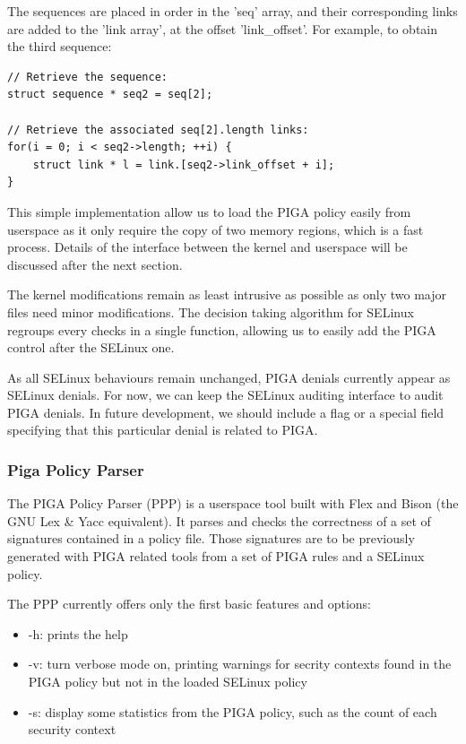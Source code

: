 \documentclass[pdftex,a4paper,titlepage,11pt]{article}
\begin{document}
\smallskip

The sequences are placed in order in the 'seq' array, and their corresponding
links are added to the 'link array', at the offset 'link\_offset'. For example,
to obtain the third sequence:

\begin{lstlisting}
// Retrieve the sequence:
struct sequence * seq2 = seq[2];

// Retrieve the associated seq[2].length links:
for(i = 0; i < seq2->length; ++i) {
	struct link * l = link.[seq2->link_offset + i];
}
\end{lstlisting}

\smallskip

This simple implementation allow us to load the PIGA policy easily from
userspace as it only require the copy of two memory regions, which is a fast
process. Details of the interface between the kernel and userspace will be
discussed after the next section.

\bigskip

The kernel modifications remain as least intrusive as possible as only two major
files need minor modifications. The decision taking algorithm for SELinux
regroups every checks in a single function, allowing us to easily add the PIGA
control after the SELinux one.

\bigskip

As all SELinux behaviours remain unchanged, PIGA denials currently appear as
SELinux denials. For now, we can keep the SELinux auditing interface to audit
PIGA denials. In future development, we should include a flag or a special field
specifying that this particular denial is related to PIGA.

\subsubsection{Piga Policy Parser}

The PIGA Policy Parser (PPP) is a userspace tool built with Flex and Bison (the
GNU Lex \& Yacc equivalent). It parses and checks the correctness of a set of
signatures contained in a policy file. Those signatures are to be previously
generated with PIGA related tools from a set of PIGA rules and a SELinux policy.

The PPP currently offers only the first basic features and options:
\begin{itemize}
	\item -h: prints the help
	\item -v: turn verbose mode on, printing warnings for secrity contexts found
in the PIGA policy but not in the loaded SELinux policy
	\item -s: display some statistics from the PIGA policy, such as the count of
each security context
\end{itemize}
\end{document}
